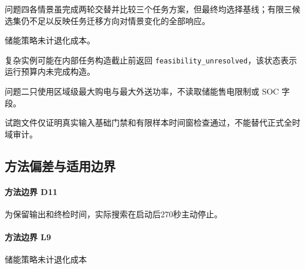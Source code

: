 问题四各情景虽完成两轮交替并比较三个任务方案，但最终均选择基线；有限三候选集仍不足以反映任务迁移方向对情景变化的全部响应。

储能策略未计退化成本。

复杂实例可能在内部任务构造截止前返回 \texttt{feasibility\_unresolved}，该状态表示运行预算内未完成构造。

问题二只使用区域级最大购电与最大外送功率，不读取储能售电限制或 SOC 字段。

试跑文件仅证明真实输入基础门禁和有限样本时间窗检查通过，不能替代正式全时域审计。


\subsection{方法偏差与适用边界}
\paragraph{方法边界 D11}为保留输出和终检时间，实际搜索在启动后270秒主动停止。

\paragraph{方法边界 L9}储能策略未计退化成本
